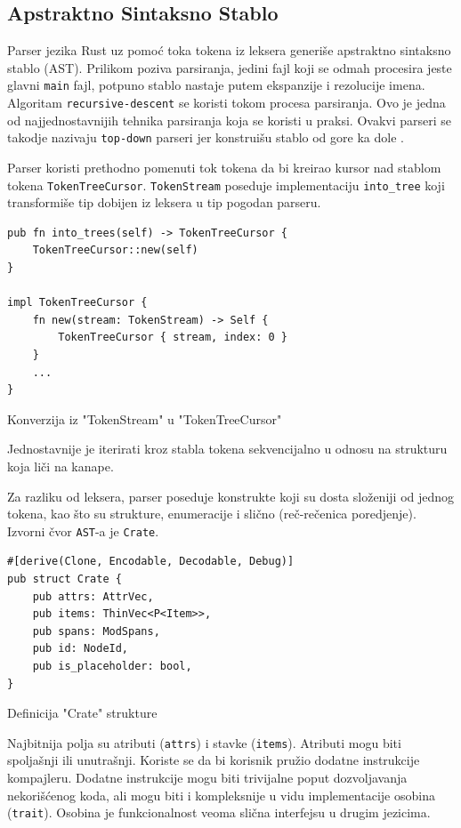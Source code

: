 \documentclass[11pt]{article}
\begin{document}
\newpage
\subsection{Apstraktno Sintaksno Stablo}

Parser jezika Rust uz pomoć toka tokena iz leksera generiše apstraktno sintaksno stablo (AST). 
Prilikom poziva parsiranja, jedini fajl koji se odmah procesira jeste glavni \verb|main| fajl, potpuno stablo
nastaje putem ekspanzije i rezolucije imena.
Algoritam \verb|recursive-descent| se koristi tokom procesa parsiranja. Ovo je jedna od najjednostavnijih
tehnika parsiranja koja se koristi u praksi. Ovakvi parseri se takodje nazivaju \verb|top-down| parseri 
jer konstruišu stablo od gore ka dole \cite{parsing}. 

Parser koristi prethodno pomenuti tok tokena da bi kreirao kursor nad stablom tokena \verb|TokenTreeCursor|.
\verb|TokenStream| poseduje implementaciju \verb|into_tree| koji transformiše tip dobijen iz leksera
u tip pogodan parseru.

\begin{listing}[H]
\begin{verbatim}
pub fn into_trees(self) -> TokenTreeCursor {
    TokenTreeCursor::new(self)
}

impl TokenTreeCursor {
    fn new(stream: TokenStream) -> Self {
        TokenTreeCursor { stream, index: 0 }
    }
    ...
}
\end{verbatim}
\caption{Konverzija iz "TokenStream" u "TokenTreeCursor"}
\end{listing}
Jednostavnije je iterirati kroz stabla tokena sekvencijalno u odnosu na strukturu koja liči na kanape.

Za razliku od leksera, parser poseduje konstrukte koji su dosta složeniji od jednog tokena, kao što su 
strukture, enumeracije i slično (reč-rečenica poredjenje). Izvorni čvor \verb|AST|-a je \verb|Crate|.

\begin{listing}[H]
\begin{verbatim}
#[derive(Clone, Encodable, Decodable, Debug)]
pub struct Crate {
    pub attrs: AttrVec,
    pub items: ThinVec<P<Item>>,
    pub spans: ModSpans,
    pub id: NodeId,
    pub is_placeholder: bool,
}
\end{verbatim}
\caption{Definicija "Crate" strukture}
\end{listing}

\newpage

Najbitnija polja su atributi (\verb|attrs|) i stavke (\verb|items|). Atributi mogu biti spoljašnji ili unutrašnji.
Koriste se da bi korisnik pružio dodatne instrukcije kompajleru. 
Dodatne instrukcije mogu biti trivijalne poput dozvoljavanja
nekorišćenog koda, ali mogu biti i kompleksnije u vidu implementacije osobina 
(\verb|trait|). Osobina je funkcionalnost veoma slična interfejsu u drugim jezicima. 
\end{document}
